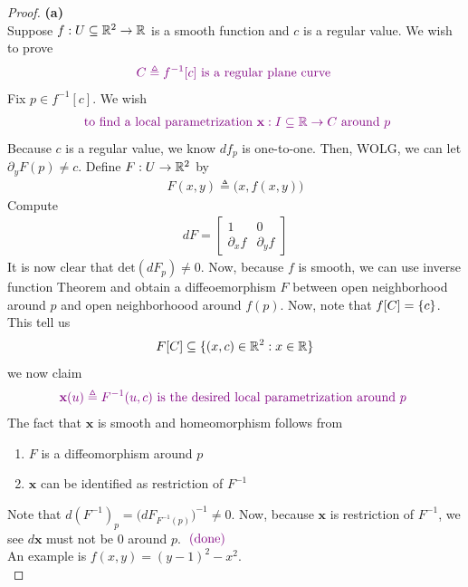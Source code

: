 \documentclass{report}
\begin{document}
\begin{proof}
\textbf{(a)}\\

Suppose $f:U\subseteq \mathbb{R}^2\rightarrow \mathbb{R}$ is a smooth function and $c$ is a regular value. We wish to prove 
\begin{align*}
  \textcolor{violet}{C\triangleq f^{-1}[c]\text{ is a regular plane curve }}
\end{align*}
Fix $p \in f^{-1}[c]$. We wish 
\begin{align*}
\textcolor{violet}{\text{ to find a local parametrization $\textbf{x}: I \subseteq \mathbb{R} \rightarrow  C$ around $p$}}
\end{align*}
Because $c$ is a regular value, we know $df_p$ is one-to-one. Then, WOLG, we can let $\partial_y F(p)\neq c$. Define $F:U\rightarrow \mathbb{R}^2$ by 
\begin{align*}
F(x,y)\triangleq \Big(x,f(x,y)\Big)
\end{align*}
Compute 
\begin{align*}
dF=\begin{bmatrix}
  1 & 0 \\
  \partial_x f & \partial _yf 
\end{bmatrix}
\end{align*}
It is now clear that  $\text{det}(dF_p)\neq 0$. Now, because $f$ is smooth, we can use inverse function Theorem and obtain a diffeoemorphism $F$ between open neighborhood around $p$ and open neighborhoood around $f(p)$. Now, note that $f[C]=\{ c \}$. This tell us 
\begin{align*}
F[C]\subseteq \{ (x,c)\in\mathbb{R}^2:x\in\mathbb{R} \}
\end{align*}
we now claim
\begin{align*}
 \textcolor{violet}{\textbf{x}(u)\triangleq F^{-1}(u,c)\text{ is the desired local parametrization around $p$ }}
\end{align*}
The fact that $\textbf{x}$ is smooth and homeomorphism follows from 
\begin{enumerate}[label=(\alph*)]
  \item $F$ is a diffeomorphism around $p$ 
  \item $\textbf{x}$ can be identified as restriction of $F^{-1}$
\end{enumerate}
Note that $d(F^{-1})_p=\big(dF_{F^{-1}(p)} \big)^{-1}\neq 0$. Now, because $\textbf{x}$ is restriction of $F^{-1}$, we see $d\textbf{x}$ must not be $0$ around  $p$. $\textcolor{violet}{\text{ (done) }}$ \\

An example is $f(x,y)=(y-1)^2 -x^2$.\\


\end{proof}
\end{document}
